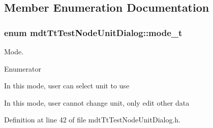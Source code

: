 \subsection{Member Enumeration Documentation}
\hypertarget{classmdt_tt_test_node_unit_dialog_a27aec8b26b20230fcf0054e2f2f5c18e}{
\subsubsection[{mode\-\_\-t}]{\setlength{\rightskip}{0pt plus 5cm}enum {\bf mdt\-Tt\-Test\-Node\-Unit\-Dialog\-::mode\-\_\-t}}}\label{classmdt_tt_test_node_unit_dialog_a27aec8b26b20230fcf0054e2f2f5c18e}


Mode. 

\begin{Desc}
\item[Enumerator]\par
\begin{description}
\item[{\em 
\hypertarget{classmdt_tt_test_node_unit_dialog_a27aec8b26b20230fcf0054e2f2f5c18ea2cbe738c7f02392a4958df04614f09bf}{Add}\label{classmdt_tt_test_node_unit_dialog_a27aec8b26b20230fcf0054e2f2f5c18ea2cbe738c7f02392a4958df04614f09bf}
}]In this mode, user can select unit to use \item[{\em 
\hypertarget{classmdt_tt_test_node_unit_dialog_a27aec8b26b20230fcf0054e2f2f5c18ea24f18a30dc0ef344be1955ba4438d525}{Edit}\label{classmdt_tt_test_node_unit_dialog_a27aec8b26b20230fcf0054e2f2f5c18ea24f18a30dc0ef344be1955ba4438d525}
}]In this mode, user cannot change unit, only edit other data \end{description}
\end{Desc}


Definition at line 42 of file mdt\-Tt\-Test\-Node\-Unit\-Dialog.\-h.



